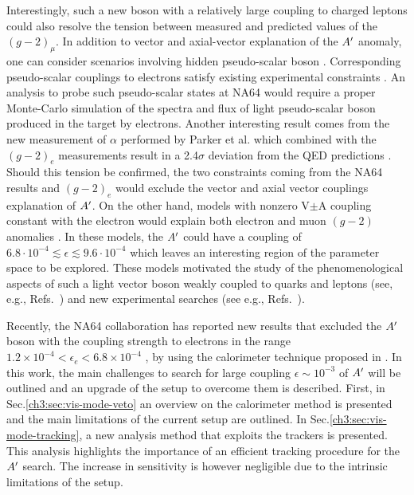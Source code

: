 Interestingly, such a new boson with a relatively large coupling to charged leptons could also resolve the tension between measured and predicted values of the $(g - 2)_{\mu}$. In addition to vector and axial-vector explanation of the $A'$ anomaly, one can consider scenarios involving hidden pseudo-scalar boson \cite{Ellwanger:2016wfe}. Corresponding pseudo-scalar couplings to electrons satisfy existing experimental constraints \cite{Andreas:2010ms,Adler:2004hp}. An analysis to probe such pseudo-scalar states at NA64 \cite{Kirpichnikov:2020tcf} would require a proper Monte-Carlo simulation of the spectra and flux of light pseudo-scalar boson produced in the target by electrons.
Another interesting result comes from the new measurement of $\alpha$ performed by Parker et al. \cite{Parker191} which combined with the $(g-2)_e$ measurements result in a 2.4$\sigma$ deviation from the QED predictions \cite{PhysRevLett.100.120801}. Should this tension be confirmed, the two constraints coming from the NA64 results and $(g - 2)_e$ would exclude the vector and axial vector couplings explanation of $A'$. On the other hand, models with nonzero V$\pm$A coupling constant with the electron would explain both electron and muon $(g - 2)$ anomalies \cite{Krasnikov:2019dgh}. In these models, the $A'$ could have a coupling of $6.8\cdot 10^{-4} \lesssim \epsilon \lesssim 9.6 \cdot 10^{-4}$ which leaves an interesting region of the parameter space to be explored.
These models motivated the study of the phenomenological aspects of such a light vector boson weakly coupled to quarks and leptons (see, e.g., Refs.~\cite{fayet1, fayet2, fayet3, fayet4,jk, cheng, Zhang:2017zap, ia, liang, bart}) 
and new experimental searches (see e.g., Refs.~\cite{battaglieri2017cosmic, nardi}).

Recently, the NA64 collaboration has reported new results that excluded the $A'$ boson  with the coupling strength  to electrons in the range $1.2 \times 10^{-4} < \epsilon_e < 6.8 \times 10^{-4}$ \cite{Banerjee:2018vgk,Banerjee:2019hmi}, by using the calorimeter technique proposed in \cite{Gninenko:2013rka,Andreas:2013lya}. In this work, the main challenges to search for large coupling $\epsilon \sim 10^{-3}$ of $A'$ will be outlined and an upgrade of the setup to overcome them is described. First, in Sec.\ref{ch3:sec:vis-mode-veto} an overview on the calorimeter method \cite{Gninenko:2013rka,Andreas:2013lya,Banerjee:2019hmi} is presented and the main limitations of the current setup are outlined. In Sec.\ref{ch3:sec:vis-mode-tracking}, a new analysis method that exploits the trackers is presented. This analysis highlights the importance of an efficient tracking procedure for the $A'$ search. The increase in sensitivity is however negligible due to the intrinsic limitations of the setup.

